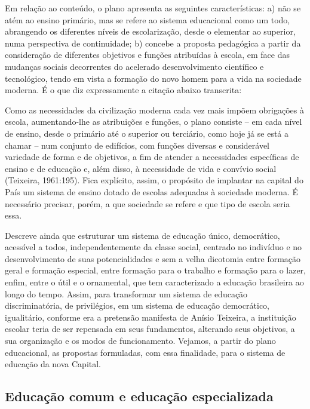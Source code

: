 Em relação ao conteúdo, o plano apresenta as seguintes características: a) não se
atém ao ensino primário, mas se refere ao sistema educacional como um todo,
abrangendo os diferentes níveis de escolarização, desde o elementar ao superior, numa
perspectiva de continuidade; b) concebe a proposta pedagógica a partir da consideração
de diferentes objetivos e funções atribuídas à escola, em face das mudanças sociais
decorrentes do acelerado desenvolvimento científico e tecnológico, tendo em vista a
formação do novo homem para a vida na sociedade moderna.
É o que diz expressamente a citação abaixo transcrita:
\begin{citacao}
    Como as necessidades da civilização moderna cada vez mais impõem
    obrigações à escola, aumentando-lhe as atribuições e funções, o plano
    consiste – em cada nível de ensino, desde o primário até o superior ou
    terciário, como hoje já se está a chamar – num conjunto de edifícios, com
    funções diversas e considerável variedade de forma e de objetivos, a fim de
    atender a necessidades específicas de ensino e de educação e, além disso, à
    necessidade de vida e convívio social (Teixeira, 1961:195).
    Fica explícito, assim, o propósito de implantar na capital do País um sistema de
    ensino dotado de escolas adequadas à sociedade moderna. É necessário precisar, porém,
    a que sociedade se refere e que tipo de escola seria essa.
\end{citacao}

Descreve  ainda que estruturar um sistema de educação único, democrático,
acessível a todos, independentemente da classe social, centrado no indivíduo e no
desenvolvimento de suas potencialidades e sem a velha dicotomia entre formação geral
e formação especial, entre formação para o trabalho e formação para o lazer, enfim,
entre o útil e o ornamental, que tem caracterizado a educação brasileira ao longo do
tempo. Assim, para transformar um sistema de educação discriminatória, de privilégios,
em um sistema de educação democrático, igualitário, conforme era a pretensão
manifesta de Anísio Teixeira, a instituição escolar teria de ser repensada em seus
fundamentos, alterando seus objetivos, a sua organização e os modos de funcionamento.
Vejamos, a partir do plano educacional, as propostas formuladas, com essa finalidade,
para o sistema de educação da nova Capital.

\subsection{Educação comum e educação especializada}

